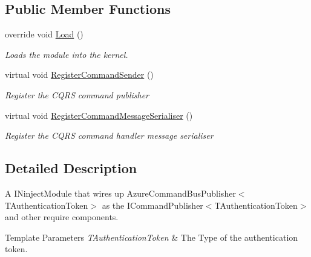 \subsection*{Public Member Functions}
\begin{DoxyCompactItemize}
\item 
override void \hyperlink{classCqrs_1_1Azure_1_1EventHub_1_1CommandBus_1_1Configuration_1_1AzureCommandHubPublisherModule_a3d15b662d1f8359c2880b7960142d84c_a3d15b662d1f8359c2880b7960142d84c}{Load} ()
\begin{DoxyCompactList}\small\item\em Loads the module into the kernel. \end{DoxyCompactList}\item 
virtual void \hyperlink{classCqrs_1_1Azure_1_1EventHub_1_1CommandBus_1_1Configuration_1_1AzureCommandHubPublisherModule_a2d123a815e4621013a4dbc2fe25a4925_a2d123a815e4621013a4dbc2fe25a4925}{Register\+Command\+Sender} ()
\begin{DoxyCompactList}\small\item\em Register the C\+Q\+RS command publisher \end{DoxyCompactList}\item 
virtual void \hyperlink{classCqrs_1_1Azure_1_1EventHub_1_1CommandBus_1_1Configuration_1_1AzureCommandHubPublisherModule_af8589ea2a7f3cff955f868390f8af2e2_af8589ea2a7f3cff955f868390f8af2e2}{Register\+Command\+Message\+Serialiser} ()
\begin{DoxyCompactList}\small\item\em Register the C\+Q\+RS command handler message serialiser \end{DoxyCompactList}\end{DoxyCompactItemize}


\subsection{Detailed Description}
A I\+Ninject\+Module that wires up Azure\+Command\+Bus\+Publisher$<$\+T\+Authentication\+Token$>$ as the I\+Command\+Publisher$<$\+T\+Authentication\+Token$>$ and other require components. 


\begin{DoxyTemplParams}{Template Parameters}
{\em T\+Authentication\+Token} & The Type of the authentication token.\\
\hline
\end{DoxyTemplParams}


